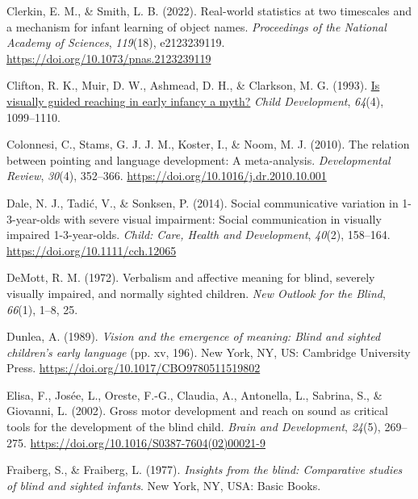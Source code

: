 \documentclass[
  man,floatsintext]{apa6}
\newlength{\cslhangindent}
\newlength{\cslentryspacingunit} %
\newenvironment{CSLReferences}[2] %
 {%
  \setlength{\parindent}{0pt}
  \ifodd #1
  \let\oldpar\par
  \def\par{\hangindent=\cslhangindent\oldpar}
  \fi
  \setlength{\parskip}{#2\cslentryspacingunit}
 }%
 {}
\begin{document}
\begin{CSLReferences}{1}{0}
\leavevmode{}%
Clerkin, E. M., \& Smith, L. B. (2022). Real-world statistics at two timescales and a mechanism for infant learning of object names. \emph{Proceedings of the National Academy of Sciences}, \emph{119}(18), e2123239119. \url{https://doi.org/10.1073/pnas.2123239119}

\leavevmode{}%
Clifton, R. K., Muir, D. W., Ashmead, D. H., \& Clarkson, M. G. (1993). \href{https://www.ncbi.nlm.nih.gov/pubmed/8404258}{Is visually guided reaching in early infancy a myth?} \emph{Child Development}, \emph{64}(4), 1099--1110.

\leavevmode{}%
Colonnesi, C., Stams, G. J. J. M., Koster, I., \& Noom, M. J. (2010). The relation between pointing and language development: {A} meta-analysis. \emph{Developmental Review}, \emph{30}(4), 352--366. \url{https://doi.org/10.1016/j.dr.2010.10.001}

\leavevmode{}%
Dale, N. J., Tadić, V., \& Sonksen, P. (2014). Social communicative variation in 1-3-year-olds with severe visual impairment: {Social} communication in visually impaired 1-3-year-olds. \emph{Child: Care, Health and Development}, \emph{40}(2), 158--164. \url{https://doi.org/10.1111/cch.12065}

\leavevmode{}%
DeMott, R. M. (1972). Verbalism and affective meaning for blind, severely visually impaired, and normally sighted children. \emph{New Outlook for the Blind}, \emph{66}(1), 1--8, 25.

\leavevmode{}%
Dunlea, A. (1989). \emph{Vision and the emergence of meaning: {Blind} and sighted children's early language} (pp. xv, 196). {New York, NY, US}: {Cambridge University Press}. \url{https://doi.org/10.1017/CBO9780511519802}

\leavevmode{}%
Elisa, F., Josée, L., Oreste, F.-G., Claudia, A., Antonella, L., Sabrina, S., \& Giovanni, L. (2002). Gross motor development and reach on sound as critical tools for the development of the blind child. \emph{Brain and Development}, \emph{24}(5), 269--275. \url{https://doi.org/10.1016/S0387-7604(02)00021-9}

\leavevmode{}%
Fraiberg, S., \& Fraiberg, L. (1977). \emph{Insights from the blind: {Comparative} studies of blind and sighted infants}. {New York, NY, USA}: {Basic Books}.


\end{CSLReferences}
\end{document}

